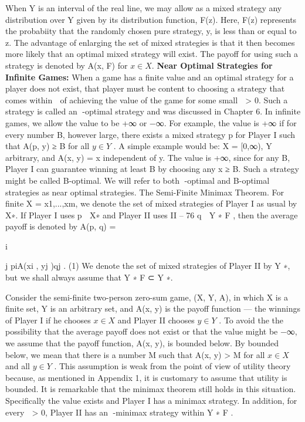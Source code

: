 \documentclass[]{report}
\begin{document}
When Y is an interval of the real line, we may allow as a mixed strategy any distribution
over Y given by its distribution function, F(z). Here, F(z) represents the probabiity
that the randomly chosen pure strategy, y, is less than or equal to z. The advantage of
enlarging the set of mixed strategies is that it then becomes more likely that an optimal
mixed strategy will exist. The payoff for using such a strategy is denoted by A(x, F) for
$x \in X$.
\noindent \textbf{Near Optimal Strategies for Infinite Games:} When a game has a finite value and
an optimal strategy for a player does not exist, that player must be content to choosing
a strategy that comes within  of achieving the value of the game for some small  > 0.
Such a strategy is called an -optimal strategy and was discussed in Chapter 6.
In infinite games, we allow the value to be +∞ or −∞. For example, the value is +∞
if for every number B, however large, there exists a mixed strategy p for Player I such
that A(p, y) ≥ B for all $y \in Y$ . A simple example would be: X = [0,∞), Y arbitrary, and
A(x, y) = x independent of y. The value is +∞, since for any B, Player I can guarantee
winning at least B by choosing any x ≥ B. Such a strategy might be called B-optimal.
We will refer to both -optimal and B-optimal strategies as near optimal strategies.
The Semi-Finite Minimax Theorem. For finite X = {x1,...,xm}, we denote the set
of mixed strategies of Player I as usual by X∗. If Player I uses p ∈ X∗ and Player II uses
II – 76
q ∈ Y ∗
F , then the average payoff is denoted by
A(p, q) = 

i


j
piA(xi , yj )qj . (1)
We denote the set of mixed strategies of Player II by Y ∗, but we shall always assume that
Y ∗
F ⊂ Y ∗.

Consider the semi-finite two-person zero-sum game, (X, Y, A), in which X is a finite
set, Y is an arbitrary set, and A(x, y) is the payoff function — the winnings of Player I
if he chooses $x \in X$ and Player II chooses $y \in Y$ . To avoid the the possibility that the
average payoff does not exist or that the value might be −∞, we assume that the payoff
function, A(x, y), is bounded below. By bounded below, we mean that there is a number
M such that A(x, y) > M for all $x \in X$ and all $y \in Y$ . This assumption is weak from
the point of view of utility theory because, as mentioned in Appendix 1, it is customary
to assume that utility is bounded.
It is remarkable that the minimax theorem still holds in this situation. Specifically
the value exists and Player I has a minimax strategy. In addition, for every  > 0, Player
II has an -minimax strategy within Y ∗
F .
\end{document}
